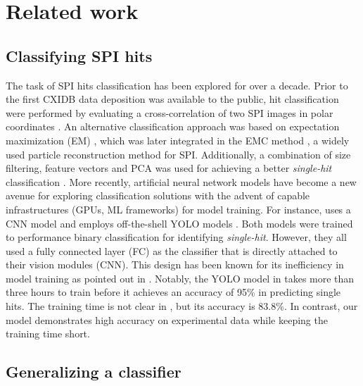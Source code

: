 \section{Related work}

\subsection{Classifying SPI hits}

The task of SPI hits classification has been explored for over a decade. Prior
to the first CXIDB data deposition \cite{seibertSingleMimivirusParticles2011}
was available to the public, hit classification were performed by evaluating a
cross-correlation of two SPI images in polar coordinates
\cite{bortelClassificationAveragingRandom2009}.  An alternative classification
approach was based on expectation maximization (EM)
\cite{dempsterMaximumLikelihoodIncomplete1977}, which was later integrated in
the EMC method \cite{lohReconstructionAlgorithmSingleparticle2009}, a widely
used particle reconstruction method for SPI.  Additionally, a combination of
size filtering, feature vectors and PCA was used for achieving a better
\textit{single-hit} classification
\cite{bobkovSortingAlgorithmsSingleparticle2015}.  More recently, artificial
neural network models have become a new avenue for exploring classification
solutions with the advent of capable infrastructures (GPUs, ML frameworks) for
model training.  For instance, \cite{shiEvaluationPerformanceClassification2019}
uses a CNN model  and \cite{ignatenkoClassificationDiffractionPatterns2021}
employs off-the-shell YOLO models \cite{redmonYOLO9000BetterFaster2016,
redmonYOLOv3IncrementalImprovement2018}.  Both models were trained to
performance binary classification for identifying \textit{single-hit}.  However,
they all used a fully connected layer (FC) as the classifier that is directly
attached to their vision modules (CNN).  This design has been known for its
inefficiency in model training as pointed out in
\cite{schroffFaceNetUnifiedEmbedding2015}.  Notably, the YOLO model in
\cite{ignatenkoClassificationDiffractionPatterns2021} takes more than three
hours to train before it achieves an accuracy of 95\% in predicting single hits.
The training time is not clear in
\cite{shiEvaluationPerformanceClassification2019}, but its accuracy is 83.8\%.
In contrast, our model demonstrates high accuracy on experimental data while
keeping the training time short.  


\subsection{Generalizing a classifier}

